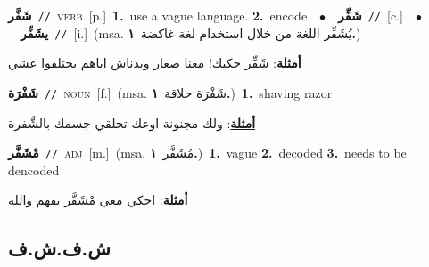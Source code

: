 \documentclass[10pt,a4paper,twoside]{article} %
\begin{document}
\begin{multicols}{2}
{\setlength\topsep{0pt}\textbf{\foreignlanguage{arabic}{شَفَّر}}\ {\color{gray}\texttt{//}\color{black}}\ \textsc{verb}\ [p.]\ \textbf{1.}~use a vague language.  \textbf{2.}~encode\ \ $\bullet$\ \ \setlength\topsep{0pt}\textbf{\foreignlanguage{arabic}{شَفِّر}}\ {\color{gray}\texttt{//}\color{black}}\ [c.]\ \ $\bullet$\ \ \setlength\topsep{0pt}\textbf{\foreignlanguage{arabic}{يشَفِّر}}\ {\color{gray}\texttt{//}\color{black}}\ [i.]\ \color{gray}(msa. \foreignlanguage{arabic}{يُشَفِّر اللغة من خلال استخدام لغة غاكضة}~\foreignlanguage{arabic}{\textbf{١.}})\color{black}\  \begin{flushright}\color{gray}\foreignlanguage{arabic}{\textbf{\underline{\foreignlanguage{arabic}{أمثلة}}}: شَفِّر حكيك! معنا صغار وبدناش اياهم يجتلقوا عشي}\end{flushright}\color{black}} \vspace{2mm}

{\setlength\topsep{0pt}\textbf{\foreignlanguage{arabic}{شَفْرَة}}\ {\color{gray}\texttt{//}\color{black}}\ \textsc{noun}\ [f.]\ \color{gray}(msa. \foreignlanguage{arabic}{شَفْرَة حلاقة}~\foreignlanguage{arabic}{\textbf{١.}})\color{black}\ \textbf{1.}~shaving razor\  \begin{flushright}\color{gray}\foreignlanguage{arabic}{\textbf{\underline{\foreignlanguage{arabic}{أمثلة}}}: ولك مجنونة اوعك تحلقي جسمك بالشَّفرة}\end{flushright}\color{black}} \vspace{2mm}

{\setlength\topsep{0pt}\textbf{\foreignlanguage{arabic}{مْشَفَّر}}\ {\color{gray}\texttt{//}\color{black}}\ \textsc{adj}\ [m.]\ \color{gray}(msa. \foreignlanguage{arabic}{مُشَفَّر}~\foreignlanguage{arabic}{\textbf{١.}})\color{black}\ \textbf{1.}~vague  \textbf{2.}~decoded  \textbf{3.}~needs to be dencoded\  \begin{flushright}\color{gray}\foreignlanguage{arabic}{\textbf{\underline{\foreignlanguage{arabic}{أمثلة}}}: احكي معي مْشَفَّر بفهم والله}\end{flushright}\color{black}} \vspace{2mm}

\vspace{-3mm}
\subsection*{\color{blue}\foreignlanguage{arabic}{ش.ف.ش.ف}\color{blue}{}} 


\end{multicols}
\end{document}
